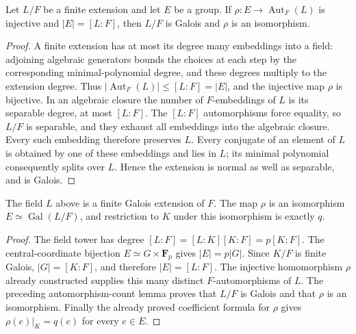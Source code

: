\begin{lemma}
\label{lem:full-galois-action-from-degree}
\leanok
Let $L/F$ be a finite extension and let $E$ be a group. If
$\rho:E\to\operatorname{Aut}_F(L)$ is injective and
$|E|=[L:F]$, then $L/F$ is Galois and $\rho$ is an isomorphism.
\end{lemma}

\begin{proof}
A finite extension has at most its degree many embeddings into a
field: adjoining algebraic generators bounds the choices at each
step by the corresponding minimal-polynomial degree, and these
degrees multiply to the extension degree. Thus
$|\operatorname{Aut}_F(L)|\le[L:F]=|E|$, and the injective map
$\rho$ is bijective.
In an algebraic closure the number of $F$-embeddings of $L$
is its separable degree, at most $[L:F]$. The $[L:F]$
automorphisms force equality, so $L/F$ is separable, and they
exhaust all embeddings into the algebraic closure. Every such
embedding therefore preserves $L$. Every conjugate of an element
of $L$ is obtained by one of these embeddings and lies in $L$;
its minimal polynomial consequently splits over $L$. Hence the
extension is normal as well as separable, and is Galois.
\end{proof}

\begin{lemma}
\label{lem:witt-lift-full-galois-group}
\leanok
The field $L$ above is a finite Galois extension of $F$.
The map $\rho$ is an isomorphism
$E\simeq\operatorname{Gal}(L/F)$, and restriction to $K$
under this isomorphism is exactly $q$.
\end{lemma}

\begin{proof}
The field tower has degree
$[L:F]=[L:K][K:F]=p[K:F]$. The central-coordinate bijection
$E\simeq G\times\mathbf F_p$ gives $|E|=p|G|$.
Since $K/F$ is finite Galois, $|G|=[K:F]$, and therefore
$|E|=[L:F]$. The injective homomorphism $\rho$ already constructed
supplies this many distinct $F$-automorphisms of $L$.
The preceding automorphism-count lemma proves that $L/F$ is
Galois and that $\rho$ is an isomorphism.
Finally the already proved coefficient formula for $\rho$ gives
$\rho(e)|_K=q(e)$ for every $e\in E$.
\end{proof}

